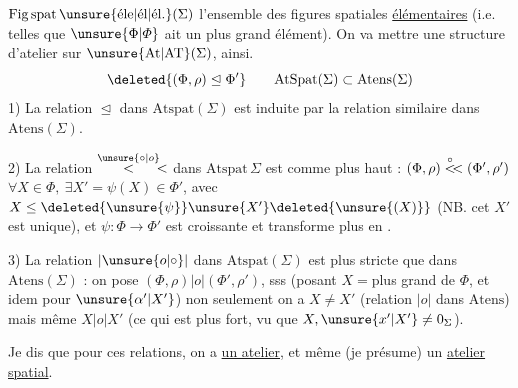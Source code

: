 $\mathrm{Fig}\,\mathrm{spat}\,\text{\unsure{éle|él|él.}}(\Sigma)$ l'ensemble des figures spatiales \uline{élémentaires} (i.e. telles que $\unsure{\Phi|\varPhi}$ ait un plus grand élément). On va mettre une structure d'atelier sur $\unsure{\mathrm{At}|\mathrm{AT}}(\Sigma)$, ainsi.
\[
\deleted{(\Phi,\rho)\trianglelefteq\Phi'}\qquad
\mathrm{AtSpat}(\Sigma)\subset\mathrm{Atens}(\Sigma)
\]
1) La relation $\trianglelefteq$ dans $\mathrm{Atspat}(\Sigma)$ est induite par la relation similaire dans $\mathrm{Atens}(\Sigma)$.

2) La relation $\mathrel{\overset{\unsure{\circ|o}}{<}\mkern-4mu<}$ dans $\mathrm{Atspat}\,\Sigma$ est  comme plus haut : $(\Phi,\rho)\mathrel{\overset{\circ}{<}\mkern-4mu<}(\Phi',\rho')$   $\forall X\in\Phi,\ \exists X'=\psi(X)\in\Phi'$, avec $X\leq\deleted{\unsure{\psi}} \unsure{X'}\deleted{\unsure{(X)}}$ (NB.  cet $X'$ est unique), et $\psi:\Phi\longrightarrow\Phi'$ est croissante  et transforme plus   en .

3) La relation $\mathrel{|\unsure{o|\circ}|}$ dans $\mathrm{Atspat}(\Sigma)$ est  plus stricte que dans $\mathrm{Atens}(\Sigma)$ : on pose $(\Phi,\rho)\mathrel{|o|}(\Phi',\rho')$, sss (posant $X={}$plus grand  de $\Phi$, et idem pour $\unsure{\alpha'|X'}$) non seulement on a $X\ne X'$ (relation $\mathrel{|o|}$ dans $\mathrm{Atens}$) mais même $X\mathrel{|o|}X'$ (ce qui est plus fort, vu que $X,\unsure{x'|X'}\ne0_\Sigma$).

Je dis que pour ces relations, on a \uline{un atelier},  et même (je présume) un \uline{atelier} \uline{spatial}.
